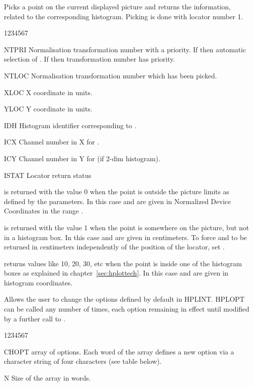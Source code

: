 \Action
Picks a point on the current displayed picture and returns the information, 
related to the corresponding histogram. Picking is done with locator number 1.
\Pdesc
\begin{DLtt}{1234567}
\item[NTPRI] Normalisation transformation number with a priority. If 
              then automatic selection of . If 
              then transformation number  has
             priority.
\item[NTLOC] Normalisation transformation number which has been picked.
\item[XLOC]  X coordinate in  units.
\item[YLOC]  Y coordinate in  units.
\item[IDH]   Histogram identifier corresponding to .
\item[ICX]   Channel number in X for .
\item[ICY]   Channel number in Y for  (if 2-dim histogram).
\item[ISTAT] Locator return status
\end{DLtt}
\Remarks
\begin{UL}
\item {} is returned with the value 0 when the point is outside the
      picture limits as defined by the  parameters. In this case 
       and  are given in Normalized Device Coordinates in 
      the range .
\item {} is returned with the value 1 when the point is somewhere on 
      the picture, but not in a histogram box.  In this case  and 
       are given in centimeters.  To force  and  
      to be returned in centimeters independently of the position of the 
      locator, set .
\item {} returns values like 10, 20, 30, etc when the point is inside
      one of the histogram boxes as explained in chapter~\ref{sec:hplottech}. 
      In this case  and  are given in histogram coordinates.
\end{UL}


\newpage%
\Action
Allows the user to change the options defined by default in HPLINT. HPLOPT can
be called any number of times, each option remaining in effect until modified by
a further call to .
\Pdesc
\begin{DLtt}{1234567}
\item[CHOPT]  array of options. Each word of the array defines a new
             option via a character string of four characters (see table below).
\item[N]     Size of the array in words.
\end{DLtt}

